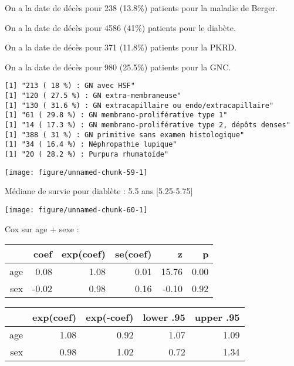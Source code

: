 \documentclass[11pt,a4paper]{article}\usepackage[]{graphicx}\usepackage[]{color}
\makeatletter
\def\maxwidth{ %
  \ifdim\Gin@nat@width>\linewidth
    \linewidth
  \else
    \Gin@nat@width
  \fi
}
\newenvironment{kframe}{%
 \def\at@end@of@kframe{}%
 \ifinner\ifhmode%
  \def\at@end@of@kframe{\end{minipage}}%
  \begin{minipage}{\columnwidth}%
 \fi\fi%
 \def\FrameCommand##1{\hskip\@totalleftmargin \hskip-\fboxsep
 \colorbox{shadecolor}{##1}\hskip-\fboxsep
     \hskip-\linewidth \hskip-\@totalleftmargin \hskip\columnwidth}%
 \MakeFramed {\advance\hsize-\width
   \@totalleftmargin\z@ \linewidth\hsize
   \@setminipage}}%
 {\par\unskip\endMakeFramed%
 \at@end@of@kframe}
\newenvironment{knitrout}{}{} %
\makeatother
\begin{document}
  On a la date de décès pour 238 (13.8\%) patients pour la maladie de Berger.
  
  On a la date de décès pour 4586 (41\%) patients pour le diabète.
  
  On a la date de décès pour 371 (11.8\%) patients pour la PKRD.
  
  On a la date de décès pour 980 (25.5\%) patients pour la GNC.

\begin{knitrout}
\color{fgcolor}\begin{kframe}
\begin{verbatim}
[1] "213 ( 18 %) : GN avec HSF"
[1] "120 ( 27.5 %) : GN extra-membraneuse"
[1] "130 ( 31.6 %) : GN extracapillaire ou endo/extracapillaire"
[1] "61 ( 29.8 %) : GN membrano-proliférative type 1"
[1] "14 ( 17.3 %) : GN membrano-proliférative type 2, dépôts denses"
[1] "388 ( 31 %) : GN primitive sans examen histologique"
[1] "34 ( 16.4 %) : Néphropathie lupique"
[1] "20 ( 28.2 %) : Purpura rhumatoïde"
\end{verbatim}
\end{kframe}
\end{knitrout}


\begin{knitrout}
\color{fgcolor}
\texttt{[image: figure/unnamed-chunk-59-1]} 

\end{knitrout}

Médiane de survie pour diablète : 5.5 ans [5.25-5.75]

\begin{knitrout}
\color{fgcolor}
\texttt{[image: figure/unnamed-chunk-60-1]} 

\end{knitrout}

Cox sur age + sexe :
\begin{table}[H]
\centering
\begin{tabular}{rrrrrr}
  \hline
 & coef & exp(coef) & se(coef) & z & p \\ 
  \hline
age & 0.08 & 1.08 & 0.01 & 15.76 & 0.00 \\ 
  sex & -0.02 & 0.98 & 0.16 & -0.10 & 0.92 \\ 
   \hline
\end{tabular}
\end{table}
\begin{table}[H]
\centering
\begin{tabular}{rrrrr}
  \hline
 & exp(coef) & exp(-coef) & lower .95 & upper .95 \\ 
  \hline
age & 1.08 & 0.92 & 1.07 & 1.09 \\ 
  sex & 0.98 & 1.02 & 0.72 & 1.34 \\ 
   \hline
\end{tabular}
\end{table}
\end{document}
